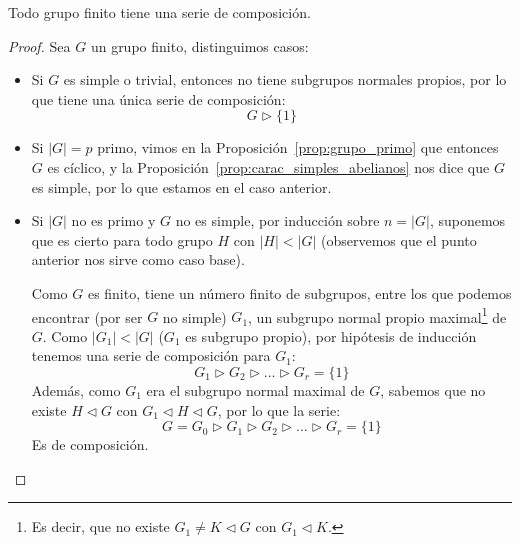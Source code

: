 \begin{prop}
    Todo grupo finito tiene una serie de composición.
    \begin{proof}
        Sea $G$ un grupo finito, distinguimos casos:
        \begin{itemize}
            \item Si $G$ es simple o trivial, entonces no tiene subgrupos normales propios, por lo que tiene una única serie de composición:
                \begin{equation*}
                    G \rhd \{1\}
                \end{equation*}
            \item Si $|G| = p$ primo, vimos en la Proposición~\ref{prop:grupo_primo} que entonces $G$ es cíclico, y la Proposición~\ref{prop:carac_simples_abelianos} nos dice que $G$ es simple, por lo que estamos en el caso anterior.
            \item Si $|G|$ no es primo y $G$ no es simple, por inducción sobre $n = |G|$, suponemos que es cierto para todo grupo $H$ con $|H|<|G|$ (observemos que el punto anterior nos sirve como caso base).

                Como $G$ es finito, tiene un número finito de subgrupos, entre los que podemos encontrar (por ser $G$ no simple) $G_1$, un subgrupo normal propio maximal\footnote{Es decir, que no existe $G_1 \neq K\lhd G$ con $G_1 \lhd  K$.} de $G$. Como $|G_1| < |G|$ ($G_1$ es subgrupo propio), por hipótesis de inducción tenemos una serie de composición para $G_1$:
                \begin{equation*}
                    G_1 \rhd G_2 \rhd \ldots \rhd G_r = \{1\}
                \end{equation*}
                Además, como $G_1$ era el subgrupo normal maximal de $G$, sabemos que no existe $H\lhd G$ con $G_1 \lhd H \lhd G$, por lo que la serie:
                \begin{equation*}
                    G = G_0 \rhd G_1 \rhd G_2 \rhd \ldots \rhd G_r = \{1\}
                \end{equation*}
                Es de composición. \qedhere
        \end{itemize}
    \end{proof}
\end{prop}

